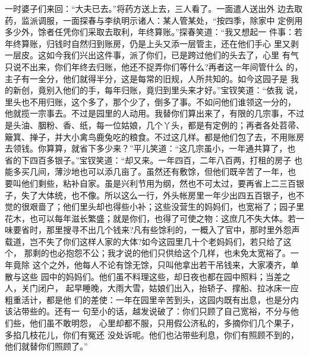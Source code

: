 一时婆子们来回：“大夫已去。”将药方送上去，三人看了。一面遣人送出外
边去取药，监派调服，一面探春与李纨明示诸人：某人管某处，“按四季，除家中
定例用多少外，馀者任凭你们采取去取利，年终算账。”探春笑道：“我又想起一
件事：若年终算账，归钱时自然归到账房，仍是上头又添一层管主，还在他们手心
里又剥一层皮。这如今我们兴出这件事，派了你们，已是跨过他们的头去了，心里
有气只说不出来，你们年终去归账，他还不捉弄你们等什么?再者这一年间管什么
的，主子有一全分，他们就得半分，这是每常的旧规，人所共知的。如今这园子是
我的新创，竟别入他们的手，每年归账，竟归到里头来才好。”宝钗笑道：“依我
说，里头也不用归账，这个多了，那个少了，倒多了事。不如问他们谁领这一分的，
他就揽一宗事去。不过是园里的人动用。我替你们算出来了，有限的几宗事，不过
是头油、胭粉、香、纸，每一位姑娘，几个丫头，都是有定例的；再者各处苕帚、
簸箕、掸子，并大小禽鸟鹿兔吃的粮食。不过这几样。都是他们包了去，不用账房
去领钱。你算算，就省下多少来？”平儿笑道：“这几宗虽小，一年通共算了，也
省的下四百多银子。”宝钗笑道：“却又来。一年四百，二年八百两，打租的房子
也能多买几间，薄沙地也可以添几亩了。虽然还有敷馀，但他们既辛苦了一年，也
要叫他们剩些，粘补自家。虽是兴利节用为纲，然也不可太过，要再省上二三百银
子，失了大体统，也不像。所以这么一行，外头帐房里一年少出四五百银子，也不
觉的很艰啬了；他们里头却也得些小补；这些没营生的妈妈们，也宽裕了；园子里
花木，也可以每年滋长繁盛；就是你们，也得了可使之物：这庶几不失大体。若一
味要省时，那里搜寻不出几个钱来?凡有些馀利的，一概入了官中，那时里外怨声
载道，岂不失了你们这样人家的大体?如今这园里几十个老妈妈们，若只给了这个，
那剩的也必抱怨不公；我才说的他们只供给这个几样，也未免太宽裕了。一年竟除
这个之外，他每人不论有馀无馀，只叫他拿出若干吊钱来，大家凑齐，单散与这些
园中的妈妈们。他们虽不料理这些，却日夜也都在园中照料；当差之人，关门闭户，
起早睡晚，大雨大雪，姑娘们出入，抬轿子、撑船、拉冰床一应粗重活计，都是他
们的差使：一年在园里辛苦到头，这园内既有出息，也是分内该沾带些的。还有一
句至小的话，越发说破了：你们只顾了自己宽裕，不分与他们些，他们虽不敢明怨，
心里却都不服，只用假公济私的，多摘你们几个果子，多掐几枝花儿，你们有冤还
没处诉呢。他们也沾带些利息，你们有照顾不到的，他们就替你们照顾了。”

